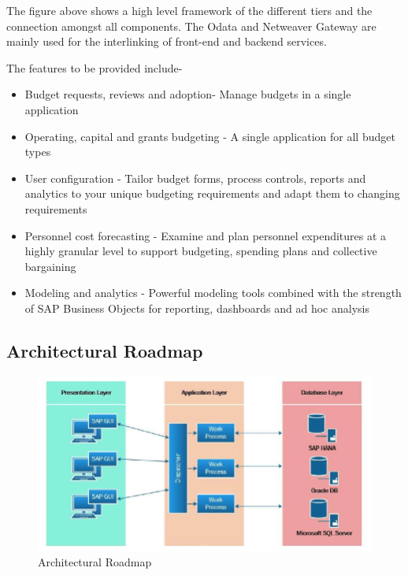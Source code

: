        The figure above shows a high level framework of the different tiers and the connection
        amongst all components. The Odata and Netweaver Gateway are mainly used for the
        interlinking of front-end and backend services.
    
    
        The features to be provided include-
    
        \begin{itemize}
            \item Budget requests, reviews and adoption- Manage budgets in a single application
    
            \item Operating, capital and grants budgeting - A single application for all budget types
    
            \item User configuration - Tailor budget forms, process controls, reports and analytics to your unique budgeting requirements and adapt them to changing requirements
            \item Personnel cost forecasting - Examine and plan personnel expenditures at a highly granular level to support budgeting, spending plans and collective bargaining
            \item Modeling and analytics - Powerful modeling tools combined with the strength of SAP Business Objects for reporting, dashboards and ad hoc analysis
    
    \end{itemize}
    
    \subsection{Architectural Roadmap}
    
    \begin{figure}[H]
        \centering
            \includegraphics[scale=0.5]{Chapter1/Figures/arch2.png}
            \caption{Architectural Roadmap}
            \label{fig:architectural}
    \end{figure}


